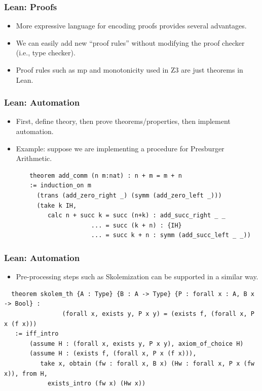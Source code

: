 \documentclass[svgnames,table,mathserif]{beamer}
\begin{document}
\begin{frame}
\frametitle{Lean: Proofs}
  \begin{itemize}
  \item More expressive language for encoding proofs provides several
advantages.
  \item {\color{red} We can easily add new ``proof rules'' without
modifying the proof checker} (i.e., type checker).
  \item Proof rules such as {\color{red} mp} and {\color{red} monotonicity} used in Z3 are just theorems in Lean.
  \end{itemize}
\end{frame}

\begin{frame}[fragile]
\frametitle{Lean: Automation}
  \begin{itemize}
  \item First, define theory, then prove theorems/properties, then implement automation.
  \item Example: suppose we are implementing a procedure for Presburger Arithmetic.
  \end{itemize}

{\tiny
\begin{verbatim}
       theorem add_comm (n m:nat) : n + m = m + n
       := induction_on m
         (trans (add_zero_right _) (symm (add_zero_left _)))
         (take k IH,
            calc n + succ k = succ (n+k) : add_succ_right _ _
                        ... = succ (k + n) : {IH}
                        ... = succ k + n : symm (add_succ_left _ _))
\end{verbatim}
}
\end{frame}

\begin{frame}[fragile]
\frametitle{Lean: Automation}
  \begin{itemize}
  \item Pre-processing steps such as Skolemization can be supported in
a similar way.
  \end{itemize}

{\tiny
\begin{verbatim}
  theorem skolem_th {A : Type} {B : A -> Type} {P : forall x : A, B x -> Bool} :
                (forall x, exists y, P x y) = (exists f, (forall x, P x (f x)))
   := iff_intro
       (assume H : (forall x, exists y, P x y), axiom_of_choice H)
       (assume H : (exists f, (forall x, P x (f x))),
          take x, obtain (fw : forall x, B x) (Hw : forall x, P x (fw x)), from H,
            exists_intro (fw x) (Hw x))
\end{verbatim}
}
\end{frame}
\end{document}
